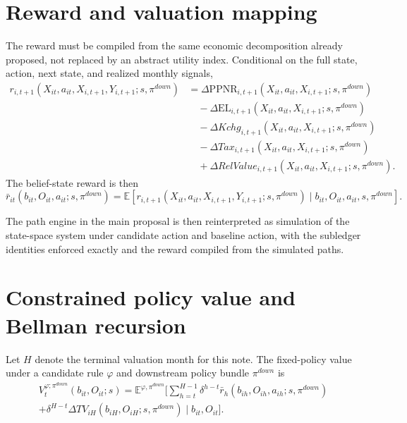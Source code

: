 \documentclass[11pt]{article}
\newcommand{\E}{\mathbb{E}}
\newcommand{\PPNR}{\mathrm{PPNR}}
\newcommand{\EL}{\mathrm{EL}}
\newcommand{\1}{\mathbf{1}}
\theoremstyle{definition}
\begin{document}
\section{Reward and valuation mapping}

The reward must be compiled from the same economic decomposition already
proposed, not replaced by an abstract utility index. Conditional on the full
state, action, next state, and realized monthly signals,
\begin{align}
  r_{i,t+1}(X_{it},a_{it},X_{i,t+1},Y_{i,t+1};s,\pi^{down})
  &=
  \Delta \PPNR_{i,t+1}(X_{it},a_{it},X_{i,t+1};s,\pi^{down})
  \nonumber\\
  &\quad
  - \Delta \EL_{i,t+1}(X_{it},a_{it},X_{i,t+1};s,\pi^{down})
  \nonumber\\
  &\quad
  - \Delta Kchg_{i,t+1}(X_{it},a_{it},X_{i,t+1};s,\pi^{down})
  \nonumber\\
  &\quad
  - \Delta Tax_{i,t+1}(X_{it},a_{it},X_{i,t+1};s,\pi^{down})
  \nonumber\\
  &\quad
  + \Delta RelValue_{i,t+1}(X_{it},a_{it},X_{i,t+1};s,\pi^{down}).
  \label{eq:full-state-reward}
\end{align}
The belief-state reward is then
\begin{equation}
  \bar r_{it}(b_{it},O_{it},a_{it};s,\pi^{down})
  =
  \E\!\left[
    r_{i,t+1}(X_{it},a_{it},X_{i,t+1},Y_{i,t+1};s,\pi^{down})
    \mid b_{it},O_{it},a_{it},s,\pi^{down}
  \right].
  \label{eq:belief-reward}
\end{equation}

The path engine in the main proposal is then reinterpreted as simulation of the
state-space system under candidate action and baseline action, with the
subledger identities enforced exactly and the reward compiled from the simulated
paths.

\section{Constrained policy value and Bellman recursion}

Let $H$ denote the terminal valuation month for this note. The fixed-policy
value under a candidate rule $\varphi$ and downstream policy bundle
$\pi^{down}$ is
\begin{equation}
  \begin{split}
  V_t^{\varphi;\pi^{down}}(b_{it},O_{it};s)
  =
  \E^{\varphi,\pi^{down}}\!\Biggl[
    \sum_{h=t}^{H-1}\delta^{h-t}
      \bar r_h(b_{ih},O_{ih},a_{ih};s,\pi^{down})
    \\
    + \delta^{H-t}\Delta TV_{iH}(b_{iH},O_{iH};s,\pi^{down})
    \mid b_{it},O_{it}
  \Biggr].
  \end{split}
  \label{eq:policy-value}
\end{equation}
\end{document}
